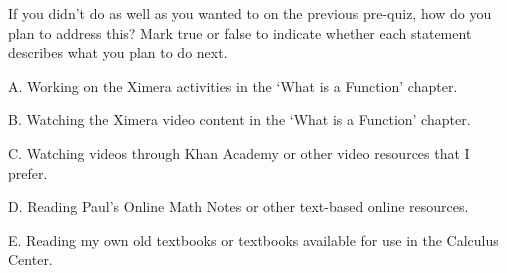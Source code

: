 \documentclass{ximera}
\begin{document}
\begin{question}

If you didn't do as well as you wanted to on the previous pre-quiz, how do you plan to address this?  Mark true or false to indicate whether each statement describes what you plan to do next.

\vspace{1 in}

\begin{question}

    A. Working on the Ximera activities in the `What is a Function' chapter.

    \begin{multipleChoice}
    \end{multipleChoice}
    
\end{question}
\begin{question}
    
    B. Watching the Ximera video content in the `What is a Function' chapter. 
    
    \begin{multipleChoice}
    \end{multipleChoice}
    
\end{question}
\begin{question}
    
    C. Watching videos through Khan Academy or other video resources that I prefer.

    \begin{multipleChoice}
    \end{multipleChoice}
    
\end{question}
\begin{question}
    
    D. Reading Paul's Online Math Notes or other text-based online resources.

    \begin{multipleChoice}
    \end{multipleChoice}
    
\end{question}
\begin{question}
    
    E. Reading my own old textbooks or textbooks available for use in the Calculus Center.


\end{question}
\end{question}
\end{document}
